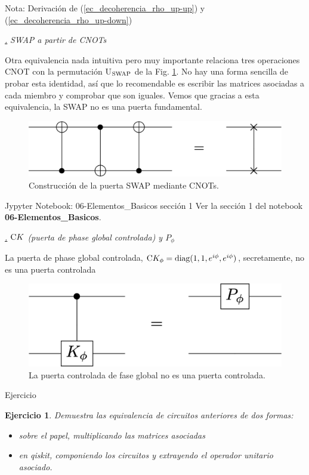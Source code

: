 \documentclass[a4paper,11pt]{book} %
\newtheorem{ejercicio_contador}{Ejercicio}
\newcommand{\Ejercicio}[1]{
		\begin{mybox_gray}{Ejercicio} 
			\begin{ejercicio_contador}
				 #1 
			\end{ejercicio_contador} 
		\end{mybox_gray}
	}
\numberwithin{equation}{chapter}
\newcommand{\cg}[1]{{\rm C}#1}
\def\subsubiContadorIt{\par\addtocounter{subsubsection}{1}\underline{\it\thesubsubsection.}\hskip0.5cm \setcounter{subsubsubsectionIt}{0}}
\newcommand{\SubsubiIt}[1]{
		\subsubiContadorIt \textit{#1}
	}
\newcounter{subsubsubsectionIt}[subsubsection]
\begin{document}
\begin{mybox_blue}{Nota: Derivación de (\ref{ec_decoherencia_rho_up-up}) y  (\ref{ec_decoherencia_rho_up-down})}
			\SubsubiIt{SWAP a partir de CNOTs} 

Otra  equivalencia nada intuitiva pero muy importante relaciona tres operaciones CNOT con la permutación U$_{\rm SWAP}$ de la Fig. \ref{Fig_elementos_Equiv_CNOTs}. No hay una forma sencilla de probar esta identidad, así que lo recomendable es escribir las matrices asociadas a cada miembro y comprobar que son iguales. Vemos que gracias a esta equivalencia, la SWAP no es una puerta fundamental.
	\begin{figure}[H]
	\centering 
	\includegraphics[width=0.45\linewidth]{Figuras/Fig_elementos_Equiv_CNOTs}
	\caption{Construcción de la puerta SWAP mediante CNOTs.}
	\label{Fig_elementos_Equiv_CNOTs}
	\end{figure}

	\begin{mybox_orange}{Jypyter Notebook: 06-Elementos\_Basicos sección 1}
	Ver la sección 1 del notebook \textbf{06-Elementos\_Basicos}.
	\end{mybox_orange}



			\SubsubiIt{$\cg{K}$ (puerta de phase global controlada) y $P_\phi$}

La puerta de phase global controlada, $\cg{K_\phi} = {\rm diag} (1,1,e^{i\phi}, e^{i\phi})$, secretamente, no es una puerta controlada
	\begin{figure}[H]
	\centering 
	\includegraphics[width=0.35\linewidth]{Figuras/Fig_elementos_Equiv_Kphase}
	\caption{La puerta controlada de fase global no es una puerta controlada.}
	\label{Fig_elementos_Equiv_Kphase}
	\end{figure}



	\Ejercicio{Demuestra las equivalencia de circuitos anteriores de dos formas:
	\begin{itemize}
		\item[a)] sobre el papel,  multiplicando las matrices asociadas
		\item[b)] en qiskit, componiendo los circuitos y extrayendo el operador unitario asociado.
	\end{itemize}
	}
	

\end{mybox_blue}
\end{document}
